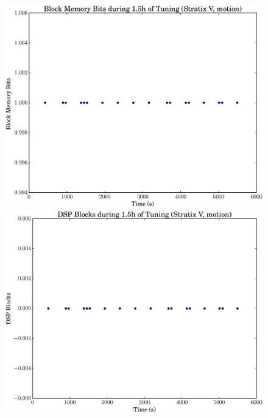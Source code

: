\documentclass[12pt, a4paper]{article}
\begin{document}
\begin{figure}[htpb]
    \begin{minipage}{.48\textwidth}
        \includegraphics[scale=.25]{motion_block_5400_chstone_StratixV}
    \end{minipage}%
    \hfill
    \begin{minipage}{.48\textwidth}
        \includegraphics[scale=.25]{motion_dsp_5400_chstone_StratixV}
    \end{minipage}%


\end{figure}
\end{document}
